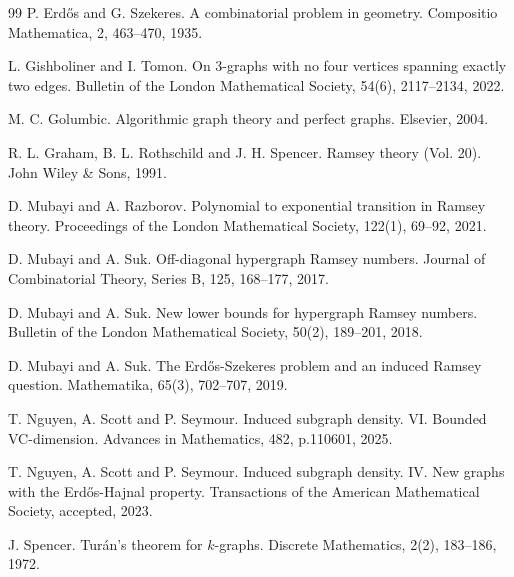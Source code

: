 \documentclass[11pt]{article}
\theoremstyle{plain}
\begin{document}
\begin{thebibliography}{99}
P. Erdős and G. Szekeres. A combinatorial problem in geometry. Compositio Mathematica, 2, 463–470, 1935.  

L. Gishboliner and I. Tomon. On 3-graphs with no four vertices spanning exactly two edges. Bulletin of the London Mathematical Society, 54(6), 2117–2134, 2022. 

M. C. Golumbic. Algorithmic graph theory and perfect graphs. Elsevier, 2004. 

R. L. Graham, B. L. Rothschild and J. H. Spencer. Ramsey theory (Vol. 20). John Wiley \& Sons, 1991. 

D. Mubayi and A. Razborov. Polynomial to exponential transition in Ramsey theory. Proceedings of the London Mathematical Society, 122(1), 69–92, 2021. 

D. Mubayi and A. Suk. Off-diagonal hypergraph Ramsey numbers. Journal of Combinatorial Theory, Series B, 125, 168–177, 2017. 

D. Mubayi and A. Suk. New lower bounds for hypergraph Ramsey numbers. Bulletin of the London Mathematical Society, 50(2), 189–201, 2018. 

D. Mubayi and A. Suk. The Erd\H{o}s-Szekeres problem and an induced Ramsey question. Mathematika, 65(3), 702–707, 2019. 

T. Nguyen, A. Scott and P. Seymour. Induced subgraph density. VI. Bounded VC-dimension. Advances in Mathematics, 482, p.110601, 2025.


T. Nguyen, A. Scott and P. Seymour. Induced subgraph density. IV. New graphs with the Erdős-Hajnal property. Transactions of the American Mathematical Society, accepted, 2023. 

J. Spencer. Turán’s theorem for $k$-graphs. Discrete Mathematics, 2(2), 183–186, 1972. 

\end{thebibliography} 


	
\end{document}
